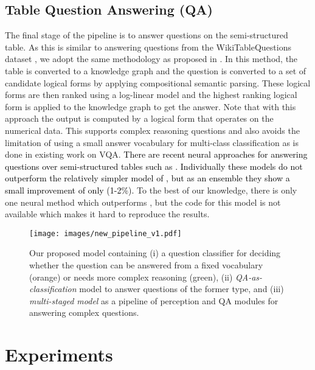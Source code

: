 \documentclass[10pt,twocolumn,letterpaper]{article}
\begin{document}
\subsection{Table Question Answering (QA)}
The final stage of the pipeline is to answer questions on the semi-structured table. 
As this is similar to answering questions from the WikiTableQuestions dataset \cite{PasupatL15}, we adopt the same methodology as proposed in \cite{PasupatL15}. 
In this method, the table is converted to a knowledge graph and the question is converted to a set of candidate logical forms by applying compositional semantic parsing.
These logical forms are then ranked using a log-linear model and the highest ranking logical form is applied to the knowledge graph to get the answer. 
Note that with this approach the output is computed by a logical form that operates on the numerical data. 
This supports complex reasoning questions and also avoids the limitation of using a small answer vocabulary for multi-class classification as is done in existing work on VQA.
\textcolor{black}{There are recent neural approaches for answering questions over semi-structured tables such as \cite{NeelakantanLAMA16,HaugGG18}. Individually these models do not outperform the relatively simpler model of \cite{PasupatL15}, but as an ensemble they show a small improvement of only (1-2\%).}
To the best of our knowledge, there is only one neural method \cite{krishnamurthy-etal-2017-neural} which outperforms \cite{PasupatL15}, but the code for this model is not available which makes it hard to reproduce the results.


\begin{figure*}
\begin{center}
\texttt{[image: images/new\_pipeline\_v1.pdf]}
\end{center}
\caption{Our proposed model containing (i) a question classifier for deciding whether the question can be answered from a fixed vocabulary (orange) or needs more complex reasoning (green), (ii) \textit{QA-as-classification} model to answer questions of the former type, and (iii) \textit{multi-staged model} as a pipeline of perception and QA modules for answering complex questions.}
\label{fig:our_model}
\end{figure*} 





\section{Experiments}
\label{sec:experiments}
\end{document}
